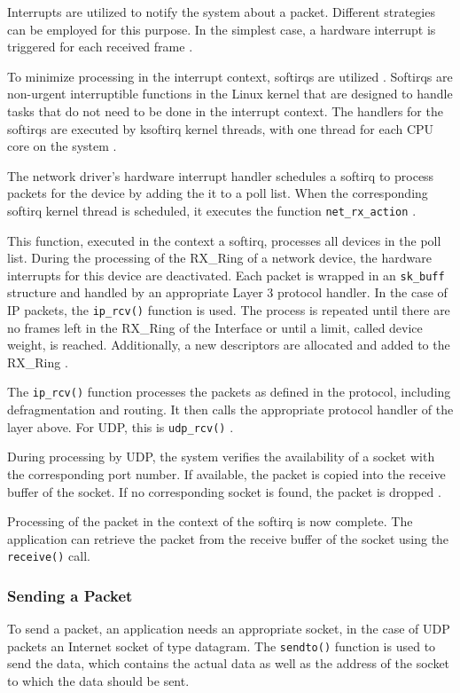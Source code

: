 Interrupts are utilized to notify the system about a packet. Different strategies can be employed for this purpose. In the simplest case, a hardware interrupt is triggered for each received frame \cite{lins06}.

To minimize processing in the interrupt context, softirqs are utilized \cite{lins03}. Softirqs are non-urgent interruptible functions in the Linux kernel that are designed to handle tasks that do not need to be done in the interrupt context. The handlers for the softirqs are executed by ksoftirq kernel threads, with one thread for each CPU core on the system \cite{like02}.

The network driver's hardware interrupt handler schedules a softirq to process packets for the device by adding the it to a poll list. When the corresponding softirq kernel thread is scheduled, it executes the function \texttt{net\_rx\_action} \cite{lins03}.

This function, executed in the context a softirq, processes all devices in the poll list. During the processing of the RX\_Ring of a network device, the hardware interrupts for this device are deactivated. Each  packet is wrapped in an \texttt{sk\_buff} structure and handled by an appropriate Layer 3 protocol handler. In the case of IP packets, the \texttt{ip\_rcv()} function is used. The process is repeated until there are no frames left in the RX\_Ring of the Interface or until a limit, called device weight, is reached. Additionally, a new descriptors are allocated and added to the RX\_Ring \cite{lins03, lins13, lins14}.

The \texttt{ip\_rcv()} function processes the packets as defined in the protocol, including defragmentation and routing. It then calls the appropriate protocol handler of the layer above. For UDP, this is \texttt{udp\_rcv()} \cite{lins01}.

During processing by UDP, the system verifies the availability of a socket with the corresponding port number. If available, the packet is copied into the receive buffer of the socket. If no corresponding socket is found, the packet is dropped \cite{lins01}.

Processing of the packet in the context of the softirq is now complete. The application can retrieve the packet from the receive buffer of the socket using the \texttt{receive()} call.


\subsubsection{Sending a Packet}
To send a packet, an application needs an appropriate socket, in the case of UDP packets an Internet socket of type datagram. The \texttt{sendto()} function is used to send the data, which contains the actual data as well as the address of the socket to which the data should be sent.

